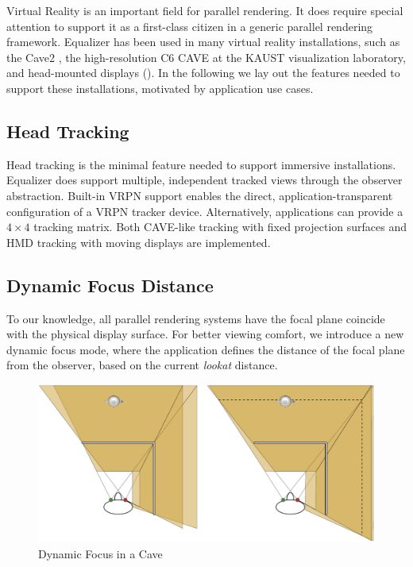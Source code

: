 Virtual Reality is an important field for parallel rendering. It does require
special attention to support it as a first-class citizen in a generic parallel
rendering framework. \textsf{Equalizer} has been used in many virtual reality
installations, such as the Cave2 \cite{FNTTL:13}, the high-resolution C6 CAVE
at the KAUST visualization laboratory, and head-mounted displays
(). In the following we lay out the features needed to support
these installations, motivated by application use cases.

\subsection{Head Tracking}

Head tracking is the minimal feature needed to support immersive installations.
\textsf{Equalizer} does support multiple, independent tracked views through the
observer abstraction. Built-in VRPN support enables the direct,
application-transparent configuration of a VRPN tracker device. Alternatively,
applications can provide a $4\times 4$ tracking matrix. Both CAVE-like tracking
with fixed projection surfaces and HMD tracking with moving displays are
implemented.

\subsection{Dynamic Focus Distance}

To our knowledge, all parallel rendering systems have the focal plane coincide
with the physical display surface. For better viewing comfort, we introduce a
new dynamic focus mode, where the application defines the distance of the focal
plane from the observer, based on the current \textit{lookat} distance.

\begin{figure}[h!t]\center
 \includegraphics[width=.9\textwidth]{images/focus}
 {\caption{\label{fFocus}Dynamic Focus in a Cave}}
\end{figure}

